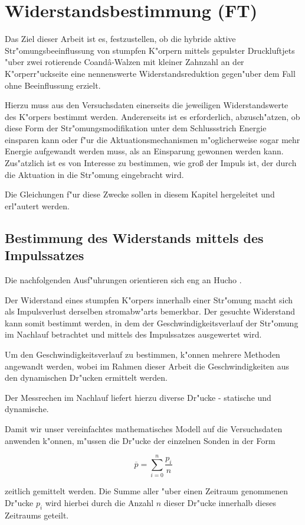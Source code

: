 \chapter{Widerstandsbestimmung (FT)}\label{s:widerstandsbestimmung}
Das Ziel dieser Arbeit ist es, festzustellen, ob die hybride aktive Str"omungsbeeinflussung von stumpfen K"orpern mittels gepulster Druckluftjets "uber zwei rotierende Coand\^{a}-Walzen mit kleiner Zahnzahl an der K"orperr"uckseite eine nennenswerte Widerstandsreduktion gegen"uber dem Fall ohne Beeinflussung erzielt.

Hierzu muss aus den Versuchsdaten einerseits die jeweiligen Widerstandswerte des K"orpers bestimmt werden. Andererseits ist es erforderlich, abzusch"atzen, ob diese Form der Str"omungsmodifikation unter dem Schlussstrich Energie einsparen kann oder f"ur die Aktuationsmechanismen m"oglicherweise sogar mehr Energie aufgewandt werden muss, als an Einsparung gewonnen werden kann.
Zus"atzlich ist es von Interesse zu bestimmen, wie gro\ss{} der Impuls ist, der durch die Aktuation in die Str"omung eingebracht wird.

Die Gleichungen f"ur diese Zwecke sollen in diesem Kapitel hergeleitet und erl"autert werden.
\section{Bestimmung des Widerstands mittels des Impulssatzes}
Die nachfolgenden Ausf"uhrungen orientieren sich eng an  Hucho \cite{Hucho.2011}.

Der Widerstand eines stumpfen K"orpers innerhalb einer Str"omung macht sich als Impulsverlust derselben stromabw"arts bemerkbar. Der gesuchte Widerstand kann somit bestimmt werden, in dem der Geschwindigkeitsverlauf der Str"omung im Nachlauf betrachtet und mittels des Impulssatzes ausgewertet wird. 

Um den Geschwindigkeitsverlauf zu bestimmen, k"onnen mehrere Methoden angewandt werden, wobei im Rahmen dieser Arbeit die Geschwindigkeiten aus den dynamischen Dr"ucken ermittelt werden.

Der Messrechen im Nachlauf liefert hierzu diverse Dr"ucke - statische und dynamische.

Damit wir unser vereinfachtes mathematisches Modell auf die Versuchsdaten anwenden k"onnen, m"ussen die Dr"ucke der einzelnen Sonden in der Form
	\begin{center}	
	\begin{equation}
		\overline{p}=\sum_{i=0}^{n}\frac{p_i}{n}
	\end{equation}
	\end{center}
zeitlich gemittelt werden.
Die Summe aller "uber einen Zeitraum genommenen Dr"ucke $p_i$ wird hierbei durch die Anzahl $n$ dieser Dr"ucke innerhalb dieses Zeitraums geteilt.

